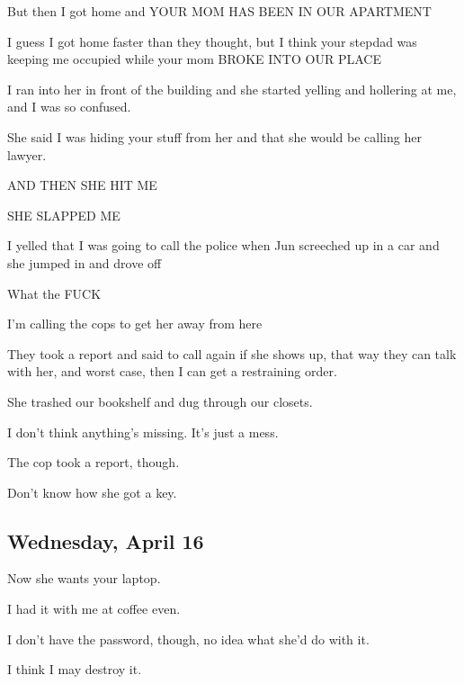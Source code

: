{ But then I got home and YOUR MOM HAS BEEN IN OUR APARTMENT

 I guess I got home faster than they thought, but I think your stepdad was keeping me occupied while your mom BROKE INTO OUR PLACE

 I ran into her in front of the building and she started yelling and hollering at me, and I was so confused.

 She said I was hiding your stuff from her and that she would be calling her lawyer.

 AND THEN SHE HIT ME

 SHE SLAPPED ME

 I yelled that I was going to call the police when Jun screeched up in a car and she jumped in and drove off

 What the FUCK

 I'm calling the cops to get her away from here

 They took a report and said to call again if she shows up, that way they can talk with her, and worst case, then I can get a restraining order.

 She trashed our bookshelf and dug through our closets.

 I don't think anything's missing. It's just a mess.

 The cop took a report, though.

 Don't know how she got a key.

\newpage

\subsection*{Wednesday, April 16}\label{wednesday-april-16}

 Now she wants your laptop.

 I had it with me at coffee even.

 I don't have the password, though, no idea what she'd do with it.

 I think I may destroy it.

}
